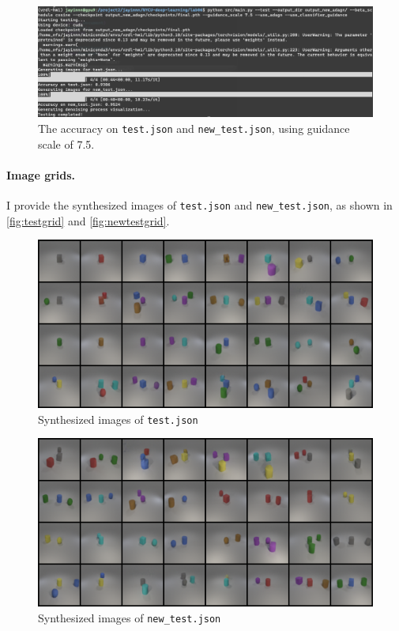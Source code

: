 \documentclass[a4paper,twocolumn]{article}
\begin{document}
\begin{figure}[H]
\centering
\includegraphics[width=0.95\linewidth]{figures/acc}
\caption{The accuracy on \texttt{test.json} and \texttt{new\_test.json}, using guidance scale of 7.5.}
\label{fig:acc}
\end{figure}

\paragraph{Image grids.} I provide the synthesized images of \texttt{test.json} and \texttt{new\_test.json}, as shown in \autoref{fig:testgrid} and \autoref{fig:newtestgrid}.
\begin{figure}[H]
\centering
\includegraphics[width=0.95\linewidth]{figures/test_grid}
\caption{Synthesized images of \texttt{test.json}}
\label{fig:testgrid}
\end{figure}

\begin{figure}[H]
\centering
\includegraphics[width=0.95\linewidth]{figures/new_test_grid}
\caption{Synthesized images of \texttt{new\_test.json}}
\label{fig:newtestgrid}
\end{figure}
\end{document}
